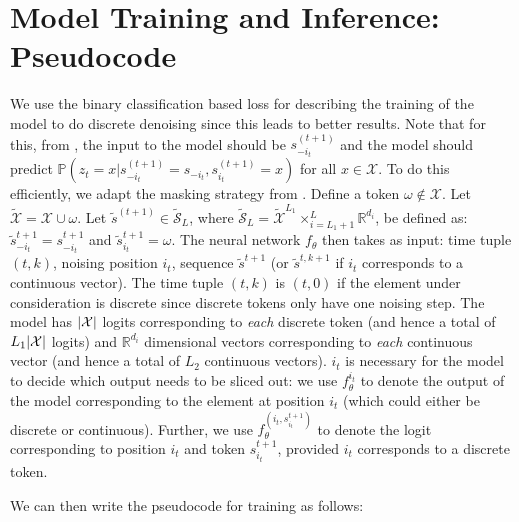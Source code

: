 \section{Model Training and Inference: Pseudocode}
\label{app:sec:model_train_pseudo}

We use the binary classification based loss for describing the training of the model to do discrete denoising since this leads to better results. Note that for this, from , the input to the model should be $s_{-i_t}^{(t+1)}$ and the model should predict $\mathbb{P}\left({z_t} = x | {s}^{(t+1)}_{-i_t} = {s}_{-i_t}, {s}^{(t+1)}_{i_t} = x \right)$ for all $x \in \mathcal{X}$. To do this efficiently, we adapt the masking strategy from \cite{varma2024glauber}. Define a token $\omega \notin \mathcal{X}$. Let $\mathcal{\tilde{X}} = \mathcal{X} \cup \omega$. Let $\tilde{s}^{(t+1)} \in \mathcal{\tilde{S}}_{L}$, where $\mathcal{\tilde{S}}_L = \mathcal{\tilde{X}}^{L_1}\times_{i=L_1+1}^{L}\mathbb{R}^{d_i}$, be defined as: $\tilde{s}^{t+1}_{-i_t} = s^{t+1}_{-i_t}$ and $\tilde{s}^{t+1}_{i_t} = \omega$. The neural network $f_{\theta}$ then takes as input: time tuple $(t, k)$, noising position $i_t$, sequence $\tilde{s}^{t+1}$ (or $\tilde{s}^{t, k+1}$ if $i_t$ corresponds to a continuous vector). The time tuple $(t, k)$ is $(t, 0)$ if the element under consideration is discrete since discrete tokens only have one noising step. The model has $\abs{\mathcal{X}}$ logits corresponding to \textit{each} discrete token (and hence a total of $L_1\abs{\mathcal{X}}$ logits) and $\mathbb{R}^{d_i}$ dimensional vectors corresponding to \textit{each} continuous vector (and hence a total of $L_2$ continuous vectors). $i_t$ is necessary for the model to decide which output needs to be sliced out: we use $f_{\theta}^{i_t}$ to denote the output of the model corresponding to the element at position $i_t$ (which could either be discrete or continuous). Further, we use $f_{\theta}^{(i_t, s_{i_t}^{t+1})}$ to denote the logit corresponding to position $i_t$ and token $s_{i_t}^{t+1}$, provided $i_t$ corresponds to a discrete token.

We can then write the pseudocode for training as follows:

